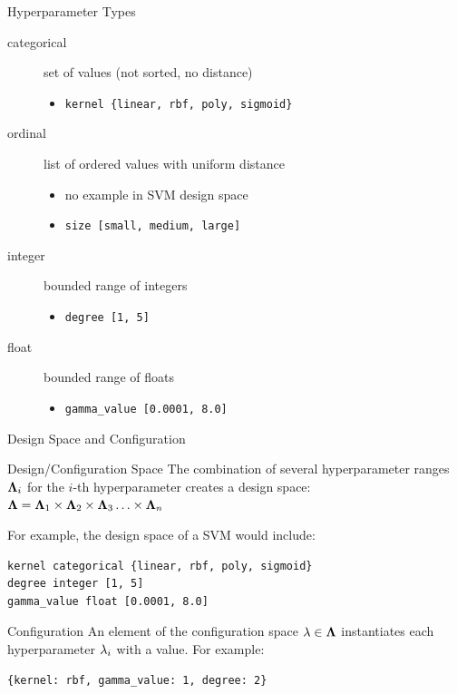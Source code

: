 \begin{frame}[c]{Hyperparameter Types}

\begin{description}
	\item[categorical] set of values (not sorted, no distance)
	\begin{itemize}
	  \item \texttt{kernel \{linear, rbf, poly, sigmoid\}}
	\end{itemize}
	\pause
	\item[ordinal] list of ordered values with uniform distance
	\begin{itemize}
	  \item no example in SVM design space
	  \item \texttt{size [small, medium, large]}
	\end{itemize}
	\pause
	\item[integer] bounded range of integers
	\begin{itemize}
	  \item \texttt{degree [1, 5]}
	\end{itemize}
	\pause
	\item[float] bounded range of floats
	\begin{itemize}
	  \item \texttt{gamma\_value [0.0001, 8.0]}
	\end{itemize}
\end{description}

\end{frame}
\begin{frame}[c,fragile]{Design Space and Configuration}

\begin{block}{Design/Configuration Space}
The combination of several hyperparameter ranges $\mathbf{\Lambda}_i$ for the $i$-th hyperparameter creates a design space:
$\mathbf{\Lambda} = \mathbf{\Lambda}_1 \times \mathbf{\Lambda}_2 \times \mathbf{\Lambda}_3 \ldots \times \mathbf{\Lambda}_n$ 

\pause
\bigskip

For example, the design space of a SVM would include:

\begin{verbatim}
kernel categorical {linear, rbf, poly, sigmoid}
degree integer [1, 5]
gamma_value float [0.0001, 8.0]
\end{verbatim}
\end{block}

\pause

\begin{block}{Configuration}
An element of the configuration space $\mathbf{\lambda} \in \mathbf{\Lambda}$ instantiates each hyperparameter $\mathbf{\lambda}_i$ with a value.
For example:
\begin{verbatim}
{kernel: rbf, gamma_value: 1, degree: 2}
\end{verbatim}

\end{block}

\end{frame}
